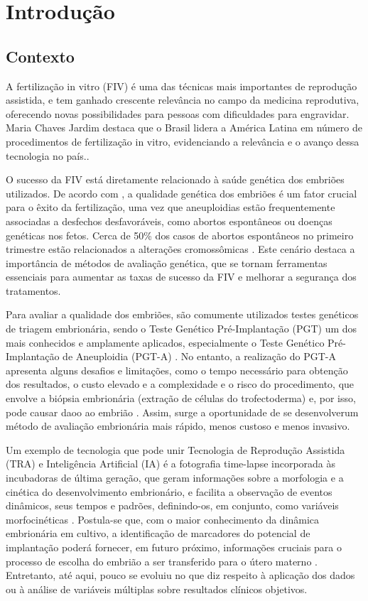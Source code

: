 \chapter[Introdução]{Introdução}

\section{Contexto}

A fertilização in vitro (FIV) é uma das técnicas mais importantes de reprodução assistida, e tem ganhado crescente relevância no campo da medicina reprodutiva, oferecendo novas possibilidades para pessoas com dificuldades para engravidar. Maria Chaves Jardim destaca que o Brasil lidera a América Latina em número de procedimentos de fertilização in vitro, evidenciando a relevância e o avanço dessa tecnologia no país.\cite{jardim2023}. 

O sucesso da FIV está diretamente relacionado à saúde genética dos embriões utilizados. De acordo com , a qualidade genética dos embriões é um fator crucial para o êxito da fertilização, uma vez que aneuploidias estão frequentemente associadas a desfechos desfavoráveis, como abortos espontâneos ou doenças genéticas nos fetos. Cerca de 50\% dos casos de abortos espontâneos no primeiro trimestre estão relacionados a alterações cromossômicas \cite{silva2023}. Este cenário destaca a importância de métodos de avaliação genética, que se tornam ferramentas essenciais para aumentar as taxas de sucesso da FIV e melhorar a segurança dos tratamentos.

Para avaliar a qualidade dos embriões, são comumente utilizados testes genéticos de triagem embrionária, sendo o Teste Genético Pré-Implantação (PGT) um dos mais conhecidos e amplamente aplicados, especialmente o Teste Genético Pré-Implantação de Aneuploidia (PGT-A) \cite{yang2024}. No entanto, a realização do PGT-A apresenta alguns desafios e limitações, como o tempo necessário para obtenção dos resultados, o custo elevado e a complexidade e o risco do procedimento, que envolve a biópsia embrionária (extração de células do trofectoderma) e, por isso, pode causar daoo ao embrião \cite{yang2024}. Assim, surge a oportunidade de se desenvolverum método de avaliação embrionária mais rápido, menos custoso e menos invasivo.

Um exemplo de tecnologia que pode unir Tecnologia de Reprodução Assistida (TRA) e Inteligência Artificial (IA) é a fotografia time-lapse incorporada às incubadoras de última geração, que geram informações sobre a morfologia e a cinética do desenvolvimento embrionário, e facilita a observação de eventos dinâmicos, seus tempos e padrões, definindo-os, em conjunto, como variáveis morfocinéticas \cite{meseguer2011}. Postula-se que, com o maior conhecimento da dinâmica embrionária em cultivo, a identificação de marcadores do potencial de implantação poderá fornecer, em futuro próximo, informações cruciais para o processo de escolha do embrião a ser transferido para o útero materno \cite{luong2023}. Entretanto, até aqui, pouco se evoluiu no que diz respeito à aplicação dos dados ou à análise de variáveis múltiplas sobre resultados clínicos objetivos.

